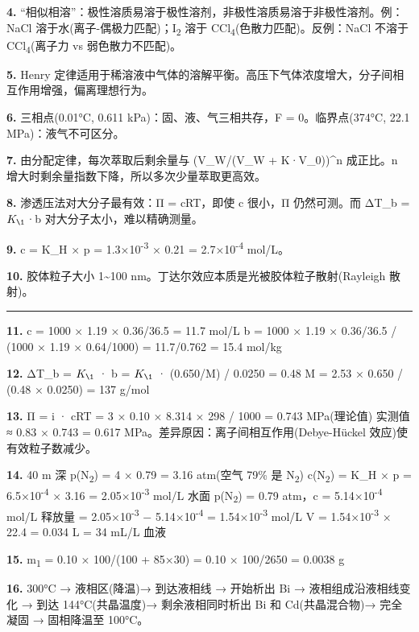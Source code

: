 \textbf{4.} ``相似相溶''：极性溶质易溶于极性溶剂，非极性溶质易溶于非极性溶剂。例：NaCl 溶于水(离子-偶极力匹配)；I\textsubscript{2} 溶于 CCl\textsubscript{4}(色散力匹配)。反例：NaCl 不溶于 CCl\textsubscript{4}(离子力 vs 弱色散力不匹配)。

\textbf{5.} Henry 定律适用于稀溶液中气体的溶解平衡。高压下气体浓度增大，分子间相互作用增强，偏离理想行为。

\textbf{6.} 三相点(0.01°C, 0.611 kPa)：固、液、气三相共存，F = 0。临界点(374°C, 22.1 MPa)：液气不可区分。

\textbf{7.} 由分配定律，每次萃取后剩余量与 (V\_W/(V\_W + K·V\_0))\^{}n 成正比。n 增大时剩余量指数下降，所以多次少量萃取更高效。

\textbf{8.} 渗透压法对大分子最有效：Π = cRT，即使 c 很小，Π 仍然可测。而 ΔT\_b = \(K_{\1}\)·b 对大分子太小，难以精确测量。

\textbf{9.} c = K\_H × p = 1.3×10\textsuperscript{-3} × 0.21 = 2.7×10\textsuperscript{-4} mol/L。

\textbf{10.} 胶体粒子大小 1\textasciitilde100 nm。丁达尔效应本质是光被胶体粒子散射(Rayleigh 散射)。

\begin{center}\rule{0.5\linewidth}{0.5pt}\end{center}

\textbf{11.} c = 1000 × 1.19 × 0.36/36.5 = 11.7 mol/L
b = 1000 × 1.19 × 0.36/36.5 / (1000 × 1.19 × 0.64/1000) = 11.7/0.762 = 15.4 mol/kg

\textbf{12.} ΔT\_b = \(K_{\1}\) · b = \(K_{\1}\) · (0.650/M) / 0.0250 = 0.48
M = 2.53 × 0.650 / (0.48 × 0.0250) = 137 g/mol

\textbf{13.} Π = i · cRT = 3 × 0.10 × 8.314 × 298 / 1000 = 0.743 MPa(理论值)
实测值 ≈ 0.83 × 0.743 = 0.617 MPa。差异原因：离子间相互作用(Debye-Hückel 效应)使有效粒子数减少。

\textbf{14.} 40 m 深 p(N\textsubscript{2}) = 4 × 0.79 = 3.16 atm(空气 79\% 是 N\textsubscript{2})
c(N\textsubscript{2}) = K\_H × p = 6.5×10\textsuperscript{-4} × 3.16 = 2.05×10\textsuperscript{-3} mol/L
水面 p(N\textsubscript{2}) = 0.79 atm，c = 5.14×10\textsuperscript{-4} mol/L
释放量 = 2.05×10\textsuperscript{-3} − 5.14×10\textsuperscript{-4} = 1.54×10\textsuperscript{-3} mol/L
V = 1.54×10\textsuperscript{-3} × 22.4 = 0.034 L = 34 mL/L 血液

\textbf{15.} m\textsubscript{1} = 0.10 × 100/(100 + 85×30) = 0.10 × 100/2650 = 0.0038 g

\textbf{16.} 300°C → 液相区(降温)→ 到达液相线 → 开始析出 Bi → 液相组成沿液相线变化 → 到达 144°C(共晶温度)→ 剩余液相同时析出 Bi 和 Cd(共晶混合物)→ 完全凝固 → 固相降温至 100°C。

